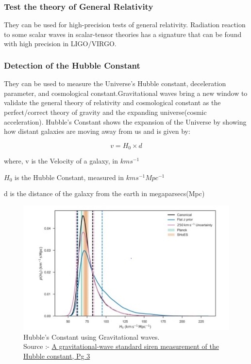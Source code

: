 \subsubsection{Test the theory of General Relativity}
\hspace{1cm}They can be used for high-precision tests of general relativity. Radiation reaction to some scalar waves in scalar-tensor theories has a signature that can be found with high precision in LIGO/VIRGO.

\subsubsection{Detection of the Hubble Constant}
\hspace{1cm}They can be used to measure the Universe’s Hubble constant, deceleration parameter, and cosmological constant.Gravitational waves bring a new window to validate the general theory of relativity and cosmological constant as the perfect/correct theory of gravity and the expanding universe(cosmic acceleration). Hubble's Constant shows the expansion of the Universe by showing how distant galaxies are moving away from us and is given by:
 
\begin{equation}
v = H_0 \times d
\end{equation}

where, v is the Velocity of a galaxy, in $kms^{-1}$

      $H_{0}$ is the Hubble Constant, measured in $kms^{-1}Mpc^{-1}$
      
      d is the distance of the galaxy from the earth in megaparsecs(Mpc)

\vspace{1cm}

\begin{figure}[h]
    \centering
    \includegraphics[scale=0.9]{images.tex/HCGW.jpg}
    \caption{Hubble's Constant using Gravitational waves.\\
    Source :- \href{https://www.researchgate.net/profile/Michael-Ross-9/publication/324600496}{A gravitational-wave standard siren measurement of the Hubble constant, Pg 3}}
\end{figure}

